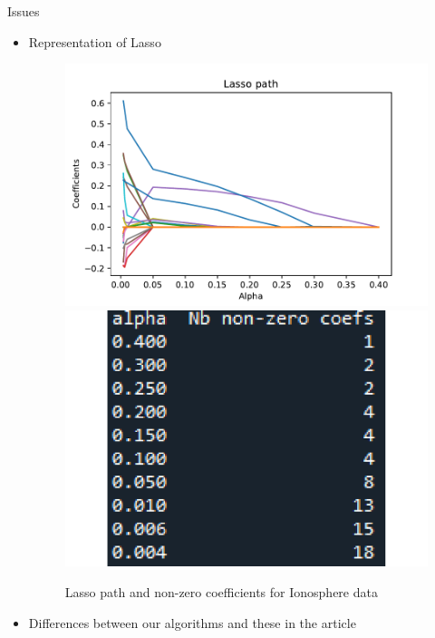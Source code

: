 \documentclass[unknownkeysallowed]{beamer}
\begin{document}
\begin{frame}{Issues}

\begin{itemize}
    \item Representation of Lasso
    \begin{figure}
        \centering
        \includegraphics[scale=0.35]{./images/alpha_choice_lasso}
        \includegraphics[scale=0.15]{./images/nb_non_zero_ionosphere}
        \caption{Lasso path and non-zero coefficients for Ionosphere data}
    \end{figure}
    \item Differences between our algorithms and these in the article
\end{itemize}
\end{frame}
\end{document}
